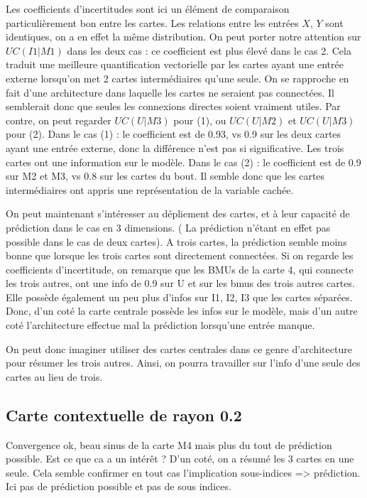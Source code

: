 Les coefficients d'incertitudes sont ici un élément de comparaison particulièrement bon entre les cartes. Les relations entre les entrées $X$, $Y$ sont identiques, on a en effet la même distribution. 
On peut porter notre attention sur $UC(I1|M1)$ dans les deux cas : ce coefficient est plus élevé dans le cas 2.
Cela traduit une meilleure quantification vectorielle par les cartes ayant une entrée externe lorsqu'on met 2 cartes intermédiaires qu'une seule. On se rapproche en fait d'une architecture dans laquelle les cartes ne seraient pas connectées. Il semblerait donc que seules les connexions directes soient vraiment utiles. 
Par contre, on peut regarder $UC(U|M3)$ pour (1), ou $UC(U|M2)$ et $UC(U|M3)$ pour (2). 
Dans le cas (1) : le coefficient est de 0.93, vs 0.9 sur les deux cartes ayant une entrée externe, donc la différence n'est pas si significative. Les trois cartes ont une information sur le modèle.
Dans le cas (2) : le coefficient est de 0.9 sur M2 et M3, vs 0.8 sur les cartes du bout. Il semble donc que les cartes intermédiaires ont appris une représentation de la variable cachée.

On peut maintenant s'intéresser au dépliement des cartes, et à leur capacité de prédiction dans le cas en 3 dimensions. ( La prédiction n'étant en effet pas possible dans le cas de deux cartes). A trois cartes, la prédiction semble moins bonne que lorsque les trois cartes sont directement connectées. 
Si on regarde les coefficients d'incertitude, on remarque que les BMUs de la carte 4, qui connecte les trois autres, ont une info de 0.9 sur U et sur les bmus des trois autres cartes. Elle possède également un peu plus d'infos sur I1, I2, I3 que les cartes séparées. 
Donc, d'un coté la carte centrale possède les infos sur le modèle, mais d'un autre coté l'architecture effectue mal la prédiction lorsqu'une entrée manque. 

On peut donc imaginer utiliser des cartes centrales dans ce genre d'architecture pour résumer les trois autres. Ainsi, on pourra travailler sur l'info d'une seule des cartes au lieu de trois.

\subsection{Carte contextuelle de rayon 0.2}
Convergence ok, beau sinus de la carte M4 mais plus du tout de prédiction possible. Est ce que ca a un intérêt ? D'un coté, on a résumé les 3 cartes en une seule. 
Cela semble confirmer en tout cas l'implication sous-indices => prédiction. Ici pas de prédiction possible et pas de sous indices. 
 
